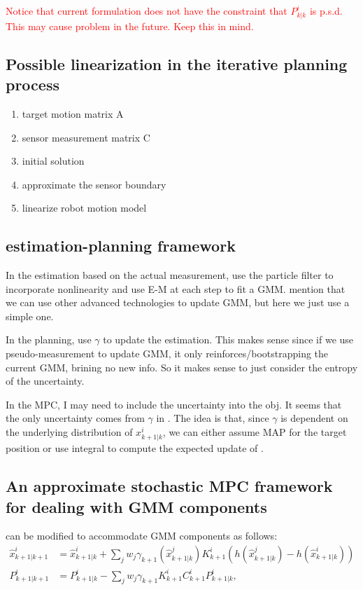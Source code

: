 \documentclass[letterpaper, 10 pt, conference]{ieeeconf}  %
\begin{document}
\textcolor{red}{Notice that current formulation does not have the constraint that $P^i_{k|k}$ is p.s.d. This may cause problem in the future. Keep this in mind.}

\subsection{Possible linearization in the iterative planning process}
\begin{enumerate}
	\item target motion matrix A
	\item sensor measurement matrix C
	\item initial solution
	\item approximate the sensor boundary
	\item linearize robot motion model
\end{enumerate}

\subsection{estimation-planning framework}
In the estimation based on the actual measurement, use the particle filter to incorporate nonlinearity and use E-M at each step to fit a GMM. mention that we can use other advanced technologies to update GMM, but here we just use a simple one.

In the planning, use $\gamma$ to update the estimation. This makes sense since if we use pseudo-measurement to update GMM, it only reinforces/bootstrapping the current GMM, brining no new info. So it makes sense to just consider the entropy of the uncertainty.

In the MPC, I may need to include the uncertainty into the obj. It seems that the only uncertainty comes from $\gamma$ in .
The idea is that, since $\gamma$ is dependent on the underlying distribution of $x^i_{k+1|k}$, we can either assume MAP for the target position or use integral to compute the expected update of .

\subsection{An approximate stochastic MPC framework for dealing with GMM components}
 can be modified to accommodate GMM components as follows:
\begin{align}
\hat{x}^i_{k+1|k+1}&=\hat{x}^i_{k+1|k}+\sum\limits_j w_j\gamma_{k+1}(\hat{x}^j_{k+1|k})K^i_{k+1}(h(\hat{x}^j_{k+1|k})-h(\hat{x}^i_{k+1|k}))\label{subeqn:upd_mean_gmm}\\
P^i_{k+1|k+1}&=P^i_{k+1|k}-\sum\limits_j w_j\gamma_{k+1}K^i_{k+1}C^i_{k+1}P^i_{k+1|k}\label{subeqn:upd_cov_gmm},
\end{align}
\end{document}
